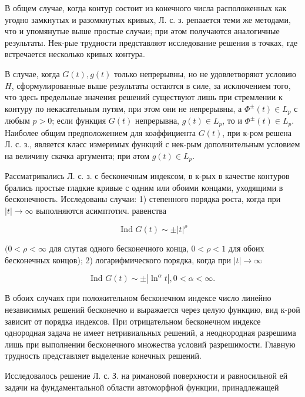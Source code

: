 \documentclass[10pt]{article}
\begin{document}
В общем случае, когда контур состоит из конечного числа расположенных как угодно замкнутых и разомкнутых кривых, Л. с. з. репаается теми же методами, что и упомянутые выше простые случаи; при әтом получаются аналогичные результаты. Нек-рые трудности представляөт исследование решения в точках, где встречается несколько кривых контура.



В случае, когда $G(t), g(t)$ только непрерывны, но не удовлетворяют условию $H$, сформулированные выше результаты остаются в силе, за исключением того, что здесь предельные значения решений существуют лишь при стремлении к контуру по некасательным путям, при этом они не непрерывны, а $\Phi^{ \pm}(t) \in L_{p}$ с любым $p>0$; если функция $G(t)$ непрерывна, $g(t) \in L_{p}$, то и $\Phi^{ \pm}(t) \in L_{p}$. Наиболее общим предположением для коәффициента $G(t)$, при к-ром решена Л. с. з., является класс измеримых функций с нек-рым дополнительным условием на величину скачка аргумента; при әтом $g(t) \in L_{p}$.



Рассматривались Л. с. з. с бесконечным индексом, в к-рых в качестве контуров брались простые гладкие кривые с одним или обоими концами, уходящими в бесконечность. Исследованы случаи: 1) степенного порядка роста, когда при $|t| \rightarrow \infty$ выполняются асимптотич. равенства



\[

\text { Ind } G(t) \sim \pm|t|^{\rho}

\]



$(0<\rho<\infty$ для слутая одного бесконечного конца, $0<\rho<1$ для обоих бесконечных концов); 2) логарифмического порядка, когда при $|t| \rightarrow \infty$



\[

\text { Ind } G(t) \sim \pm\left|\ln ^{\alpha} t\right|, 0<\alpha<\infty \text {. }

\]



В обоих случаях при положительном бесконечном индексе число линейно независимых решений бесконечно и выражается через целую функцию, вид к-рой зависит от порядка индексов. При отрицательном бесконечном индексе однородная задача не имеет нетривиальных решений, а неоднородная разрешима лишь при выполнении бесконечного множества условий разрешимости. Главную трудность представляет выделение конечных решений.



Исследовалось решение Л. с. З. на римановой поверхности и равносильной ей задачи на фундаментальной области автоморфной функции, принадлежащей
\end{document}

